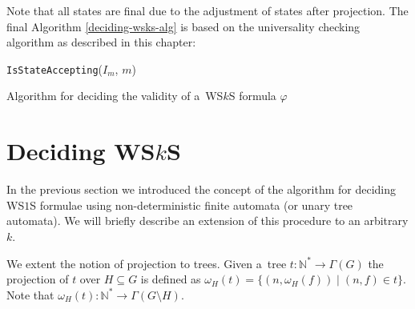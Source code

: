 Note that all states are final due to the adjustment of states after projection.
The final Algorithm \ref{deciding-wsks-alg} is based on the universality
checking algorithm as described in this chapter:

\begin{algorithm}[ht!]
		\BlankLine
		\nl \Return \texttt{IsStateAccepting}($I_m$, $m$)
		\BlankLine
		\caption{Algorithm for deciding the validity of a~WS$k$S
		formula $\varphi$}\label{deciding-wsks-alg}
	\end{algorithm}

%    

\section{Deciding WS$k$S}

In the previous section we introduced the concept of the algorithm for deciding
WS$1$S formulae using non-deterministic finite automata (or unary tree
automata).
We will briefly describe an extension of this procedure to an arbitrary $k$.

We extent the notion of projection to trees. Given a~tree $t :
\mathbb{N}^* \rightarrow \Gamma(G)$ the projection of $t$ over $H \subseteq G$
is defined as $\omega_H(t) = \{(n, \omega_H(f)) \mid (n, f) \in t\}$. Note that
$\omega_H(t) : \mathbb{N}^* \rightarrow \Gamma(G\setminus H)$.


